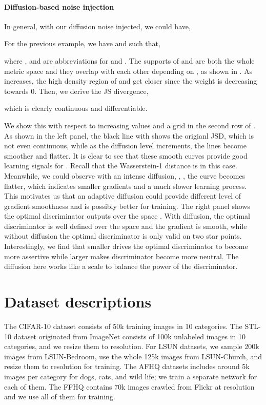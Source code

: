 \documentclass{article} \usepackage{iclr2023_conference,times}
\theoremstyle{plain}
\theoremstyle{definition}
\theoremstyle{remark}
\begin{document}
\paragraph{Diffusion-based noise injection} In general, with our diffusion noise injected, we could have,



For the previous example, we have  and  such that, 

where ,  and  are abbreviations for  and . The supports of  and  are both the whole metric space  and they overlap with each other depending on , as shown in . As  increases,  the high density region of  and  get closer since the weight  is decreasing towards 0. Then, we derive the JS divergence,

which is clearly continuous and differentiable. 

We show this  with respect to increasing  values and a  grid in the second row of . As shown in the left panel, the black line with  shows the origianl JSD, which is not even continuous, while as the diffusion level  increments, the lines become smoother and flatter. It is clear to see that these smooth curves provide good learning signals for . Recall that the Wasserstein-1 distance is  in this case. 
Meanwhile, we could observe with an intense diffusion, , , the curve becomes flatter, which indicates smaller gradients and a much slower learning process. This motivates us that an adaptive diffusion could provide different level of gradient smoothness and is possibly better for training. The right panel shows the optimal discriminator outputs over the space . With diffusion, the optimal discriminator is well defined over the space and the gradient is smooth, while without diffusion the optimal discriminator is only valid on two star points. Interestingly, we find that smaller  drives the optimal discriminator to become more assertive while larger  makes discriminator become more neutral. The diffusion here works like a scale to balance the power of the discriminator. 


\section{Dataset descriptions}\label{sec:data}
The CIFAR-10  dataset consists of 50k  training images in 10 categories. The STL-10  dataset originated from ImageNet \citep{deng2009imagenet} consists of 100k unlabeled images in 10 categories, and we resize them to  resolution. For LSUN datasets, we sample 200k images from LSUN-Bedroom, use the whole 125k images from LSUN-Church, and resize them to  resolution for training. The AFHQ datasets includes around 5k  images per category for dogs, cats, and wild life; we train a separate network for each of them. The FFHQ contains 70k images crawled from Flickr at  resolution and we use all of them for training. 
\end{document}
